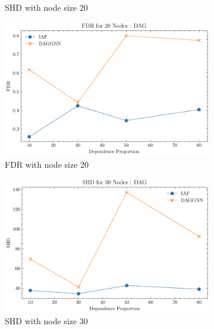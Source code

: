 \documentclass[10pt]{article}
\begin{document}
\begin{figure}[p]
\begin{subfigure}{0.45\textwidth}
        \caption{SHD with node size 20}
        \label{SHD_node20}
    \end{subfigure}
    \hfill
    \begin{subfigure}{0.45\textwidth}
        \includegraphics[width=\textwidth]{fig/FDR_dependence_20_DAG_threshold0.3.pdf}
        \caption{FDR with node size 20}
        \label{FDR_node20}
    \end{subfigure}
    \begin{subfigure}{0.45\textwidth}
        \includegraphics[width=\textwidth]{fig/SHD_dependence_30_DAG_threshold0.3.pdf}
        \caption{SHD with node size 30}
        \label{SHD_node30}
    \end{subfigure}
    \hfill
    \begin{subfigure}{0.45\textwidth}

\end{subfigure}
\end{figure}
\end{document}
